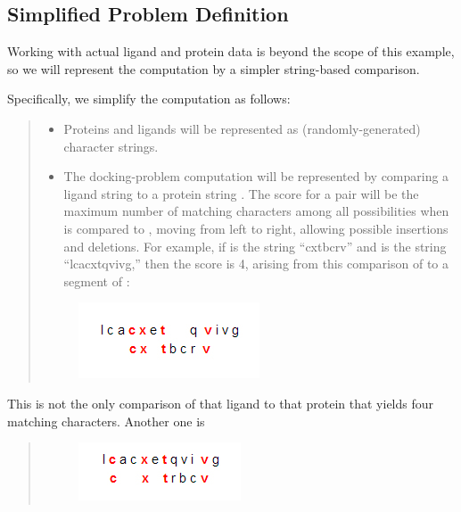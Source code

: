 \documentclass[letterpaper,10pt,openany,oneside]{sphinxmanual}
\begin{document}
\subsection{Simplified Problem Definition}
\label{intro/intro:simplified-problem-definition}
Working with actual ligand and protein data is beyond the scope of this example, so we will represent the computation by a simpler string-based comparison.

Specifically, we simplify the computation as follows:
\begin{quote}
\begin{itemize}
\item {} 
Proteins and ligands will be represented as (randomly-generated) character strings.

\item {} 
The docking-problem computation will be represented by comparing a ligand string  to a protein string .  The score for a pair \code{{[}L, P{]}} will be the maximum number of matching characters among all possibilities when  is compared to , moving from left to right, allowing possible insertions and deletions.  For example, if  is the string “cxtbcrv” and  is the string “lcacxtqvivg,” then the score is 4, arising from this comparison of  to a segment of :

\end{itemize}
\begin{figure}[htbp]
\centering

\includegraphics{seq1.jpg}
\end{figure}
\end{quote}

This is not the only comparison of that ligand to that protein that yields four matching characters. Another one is
\begin{quote}
\begin{figure}[htbp]
\centering

\includegraphics{seq2.jpg}
\end{figure}
\end{quote}
\end{document}
